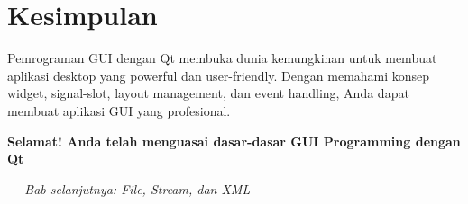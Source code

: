 \section{Kesimpulan}

Pemrograman GUI dengan Qt membuka dunia kemungkinan untuk membuat aplikasi desktop yang powerful dan user-friendly. Dengan memahami konsep widget, signal-slot, layout management, dan event handling, Anda dapat membuat aplikasi GUI yang profesional.

\begin{center}
\textbf{Selamat! Anda telah menguasai dasar-dasar GUI Programming dengan Qt}
\end{center}

\vspace{1cm}

\begin{center}
\textit{--- Bab selanjutnya: File, Stream, dan XML ---}
\end{center}

